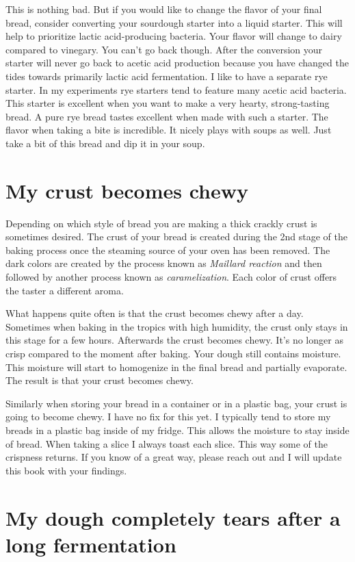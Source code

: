 This is nothing bad. But if you would like to change
the flavor of your final bread, consider converting
your sourdough starter into a liquid starter. This will
help to prioritize lactic acid-producing bacteria.
Your flavor will change to dairy compared to vinegary.
You can't go back though. After the conversion your starter
will never go back to acetic acid production because you have
changed the tides towards primarily lactic acid fermentation.
I like to have a separate rye starter. In my experiments
rye starters tend to feature many acetic acid bacteria.
This starter is excellent when you want to make a very hearty,
strong-tasting bread. A pure rye bread tastes excellent when
made with such a starter. The flavor when taking a bite
is incredible. It nicely plays with soups as well. Just take
a bit of this bread and dip it in your soup.

\section{My crust becomes chewy}

Depending on which style of bread you are making a
thick crackly crust is sometimes desired. The crust
of your bread is created during the 2nd stage of the
baking process once the steaming source of your
oven has been removed. The dark colors are created by
the process known as {\it Maillard reaction} and then followed
by another process known as {\it caramelization}. Each
color of crust offers the taster a different aroma.

What happens quite often is that the crust becomes chewy after a day.
Sometimes when baking in the tropics with high humidity, the
crust only stays in this stage for a few hours. Afterwards
the crust becomes chewy. It's no longer as crisp compared
to the moment after baking. Your dough still contains moisture.
This moisture will start to homogenize in the final bread and
partially evaporate. The result is that your crust becomes chewy.

Similarly when storing your bread in a container or in a plastic
bag, your crust is going to become chewy. I have no fix for this yet.
I typically tend to store my breads in a plastic bag inside of my fridge.
This allows the moisture to stay inside of bread. When taking a slice
I always toast each slice. This way some of the crispness returns.
If you know of a great way, please reach out and I will update
this book with your findings.

\section{My dough completely tears after a long fermentation}

